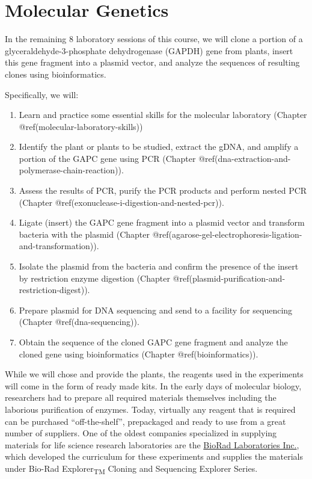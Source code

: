 \hypertarget{molecular-genetics}{%
\chapter*{Molecular Genetics}\label{molecular-genetics}}

In the remaining 8 laboratory sessions of this course, we will clone a
portion of a glyceraldehyde-3-phosphate dehydrogenase (GAPDH) gene from
plants, insert this gene fragment into a plasmid vector, and analyze the
sequences of resulting clones using bioinformatics.

Specifically, we will:

\begin{enumerate}
\def\labelenumi{\arabic{enumi}.}
\tightlist
\item
  Learn and practice some essential skills for the molecular laboratory
  (Chapter @ref(molecular-laboratory-skills))
\item
  Identify the plant or plants to be studied, extract the gDNA, and
  amplify a portion of the GAPC gene using PCR (Chapter
  @ref(dna-extraction-and-polymerase-chain-reaction)).
\item
  Assess the results of PCR, purify the PCR products and perform nested
  PCR (Chapter @ref(exonuclease-i-digestion-and-nested-pcr)).
\item
  Ligate (insert) the GAPC gene fragment into a plasmid vector and
  transform bacteria with the plasmid (Chapter
  @ref(agarose-gel-electrophoresis-ligation-and-transformation)).
\item
  Isolate the plasmid from the bacteria and confirm the presence of the
  insert by restriction enzyme digestion (Chapter
  @ref(plasmid-purification-and-restriction-digest)).
\item
  Prepare plasmid for DNA sequencing and send to a facility for
  sequencing (Chapter @ref(dna-sequencing)).
\item
  Obtain the sequence of the cloned GAPC gene fragment and analyze the
  cloned gene using bioinformatics (Chapter @ref(bioinformatics)).
\end{enumerate}

While we will chose and provide the plants, the reagents used in the
experiments will come in the form of ready made kits. In the early days
of molecular biology, researchers had to prepare all required materials
themselves including the laborious purification of enzymes. Today,
virtually any reagent that is required can be purchased
``off-the-shelf'', prepackaged and ready to use from a great number of
suppliers. One of the oldest companies specialized in supplying
materials for life science research laboratories are the
\href{https://en.wikipedia.org/wiki/Bio-Rad_Laboratories}{BioRad
Laboratories Inc.}, which developed the curriculum for these experiments
and supplies the materials under Bio-Rad Explorer\textsubscript{TM}
Cloning and Sequencing Explorer Series.

